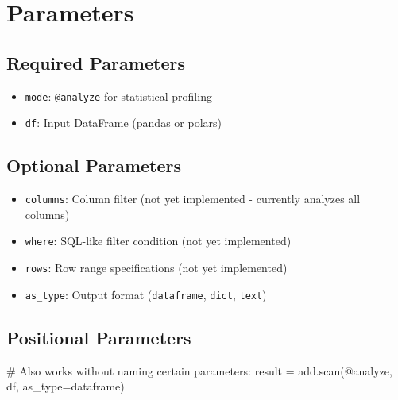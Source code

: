 \documentclass[
  letterpaper,
]{scrbook}
\newenvironment{Shaded}{\begin{snugshade}}{\end{snugshade}}
\newcommand{\CommentTok}[1]{\textcolor[rgb]{0.37,0.37,0.37}{#1}}
\newcommand{\NormalTok}[1]{\textcolor[rgb]{0.00,0.23,0.31}{#1}}
\newcommand{\OperatorTok}[1]{\textcolor[rgb]{0.37,0.37,0.37}{#1}}
\newcommand{\StringTok}[1]{\textcolor[rgb]{0.13,0.47,0.30}{#1}}
\providecommand{\tightlist}{%
  \setlength{\itemsep}{0pt}\setlength{\parskip}{0pt}}
\begin{document}
\section{Parameters}\label{parameters-4}

\subsection{Required Parameters}\label{required-parameters-3}

\begin{itemize}
\tightlist
\item
  \texttt{mode}: \texttt{\textquotesingle{}@analyze\textquotesingle{}}
  for statistical profiling
\item
  \texttt{df}: Input DataFrame (pandas or polars)
\end{itemize}

\subsection{Optional Parameters}\label{optional-parameters-3}

\begin{itemize}
\tightlist
\item
  \texttt{columns}: Column filter (not yet implemented - currently
  analyzes all columns)
\item
  \texttt{where}: SQL-like filter condition (not yet implemented)
\item
  \texttt{rows}: Row range specifications (not yet implemented)
\item
  \texttt{as\_type}: Output format
  (\texttt{\textquotesingle{}dataframe\textquotesingle{}},
  \texttt{\textquotesingle{}dict\textquotesingle{}},
  \texttt{\textquotesingle{}text\textquotesingle{}})
\end{itemize}

\subsection{Positional Parameters}\label{positional-parameters-4}

\begin{Shaded}
\begin{Highlighting}[]
\CommentTok{\# Also works without naming certain parameters:}
\NormalTok{result }\OperatorTok{=}\NormalTok{ add.scan(}\StringTok{\textquotesingle{}@analyze\textquotesingle{}}\NormalTok{, df, as\_type}\OperatorTok{=}\StringTok{\textquotesingle{}dataframe\textquotesingle{}}\NormalTok{)}
\end{Highlighting}
\end{Shaded}
\end{document}
